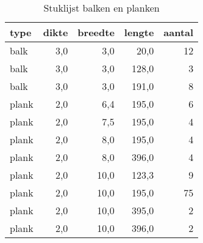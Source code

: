 \begin{table}[h!]
\centering
\caption{Stuklijst balken en planken}
\begin{tabular}{lrrrr}
\toprule
 type &  dikte &  breedte &  lengte &  aantal \\
\midrule
 balk &    3,0 &      3,0 &    20,0 &      12 \\
 balk &    3,0 &      3,0 &   128,0 &       3 \\
 balk &    3,0 &      3,0 &   191,0 &       8 \\
plank &    2,0 &      6,4 &   195,0 &       6 \\
plank &    2,0 &      7,5 &   195,0 &       4 \\
plank &    2,0 &      8,0 &   195,0 &       4 \\
plank &    2,0 &      8,0 &   396,0 &       4 \\
plank &    2,0 &     10,0 &   123,3 &       9 \\
plank &    2,0 &     10,0 &   195,0 &      75 \\
plank &    2,0 &     10,0 &   395,0 &       2 \\
plank &    2,0 &     10,0 &   396,0 &       2 \\
\bottomrule
\end{tabular}
\end{table}
